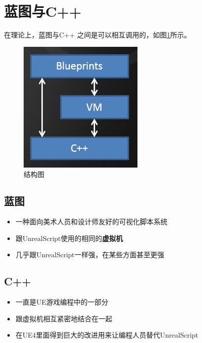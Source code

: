 \documentclass[UTF8,a4paper,12pt]{ctexbook}
\begin{document}
	
	\section{蓝图与C++}
		在理论上，蓝图与C++ 之间是可以相互调用的，如图\ref{struct}所示。
			\begin{figure}[htb]
				\centering
				\includegraphics[scale=0.6]{blueVsC.png}
				\caption{结构图}
				\label{struct}
			\end{figure}
	
		
		\subsection{蓝图}
			\begin{itemize}
				\item 一种面向美术人员和设计师友好的可视化脚本系统
				\item 跟UnrealScript使用的相同的\textbf{虚拟机}
				\item 几乎跟UnrealScript一样强，在某些方面甚至更强
			\end{itemize}
		
		\subsection{C++}
			\begin{itemize}
				\item 一直是UE游戏编程中的一部分
				\item 跟虚拟机相互紧密地结合在一起
				\item 在UE4里面得到巨大的改进用来让编程人员替代UnrealScript
			\end{itemize}
		
\end{document}
